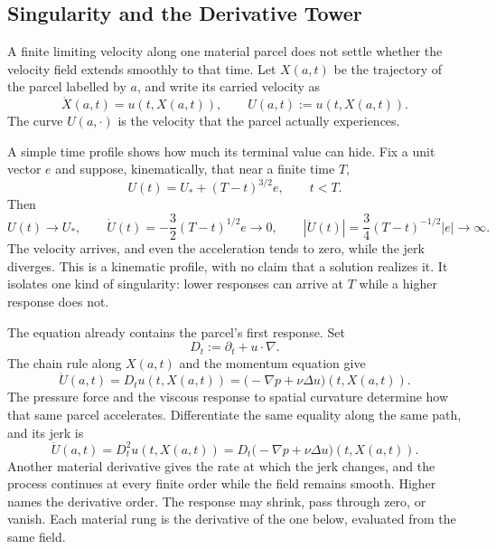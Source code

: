 \subsection{Singularity and the Derivative Tower}\label{sub:SingularityAndTheDerivativeTower}

A finite limiting velocity along one material parcel does not settle whether the velocity field extends smoothly to that time.
Let \(X(a,t)\) be the trajectory of the parcel labelled by \(a\), and write its carried velocity as
\[
  \dot X(a,t)=u(t,X(a,t)),
  \qquad
  U(a,t):=u(t,X(a,t)).
\]
The curve \(U(a,\cdot)\) is the velocity that the parcel actually experiences.

A simple time profile shows how much its terminal value can hide.
Fix a unit vector \(e\) and suppose, kinematically, that near a finite time \(T\),
\[
  U(t)=U_*+(T-t)^{3/2}e,
  \qquad t<T.
\]
Then
\[
  U(t)\longrightarrow U_*,
  \qquad
  \dot U(t)=-\frac32(T-t)^{1/2}e\longrightarrow0,
  \qquad
  |\ddot U(t)|=\frac34(T-t)^{-1/2}|e|\longrightarrow\infty.
\]
The velocity arrives, and even the acceleration tends to zero, while the jerk diverges.
This is a kinematic profile, with no claim that a \NavierStokes{} solution realizes it.
It isolates one kind of singularity: lower responses can arrive at \(T\) while a higher response does not.

The \NavierStokes{} equation already contains the parcel's first response.
Set
\[
  D_t:=\partial_t+u\cdot\nabla.
\]
The chain rule along \(X(a,t)\) and the momentum equation give
\[
  \dot U(a,t)
  =
  D_tu(t,X(a,t))
  =
  \bigl(-\nabla p+\nu\Delta u\bigr)(t,X(a,t)).
\]
The pressure force and the viscous response to spatial curvature determine how that same parcel accelerates.
Differentiate the same equality along the same path, and its jerk is
\[
  \ddot U(a,t)
  =
  D_t^2u(t,X(a,t))
  =
  D_t\bigl(-\nabla p+\nu\Delta u\bigr)(t,X(a,t)).
\]
Another material derivative gives the rate at which the jerk changes, and the process continues at every finite order while the field remains smooth.
Higher names the derivative order.
The response may shrink, pass through zero, or vanish.
Each material rung is the derivative of the one below, evaluated from the same \NavierStokes{} field.

